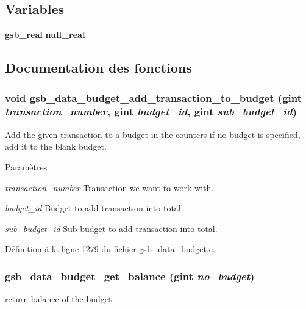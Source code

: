 \subsection*{Variables}
\begin{DoxyCompactItemize}
\item 
{\bf gsb\_\-real} {\bf null\_\-real}
\end{DoxyCompactItemize}


\subsection{Documentation des fonctions}
\subsubsection[{gsb\_\-data\_\-budget\_\-add\_\-transaction\_\-to\_\-budget}]{\setlength{\rightskip}{0pt plus 5cm}void gsb\_\-data\_\-budget\_\-add\_\-transaction\_\-to\_\-budget (gint {\em transaction\_\-number}, \/  gint {\em budget\_\-id}, \/  gint {\em sub\_\-budget\_\-id})}\label{gsb__data__budget_8c_ac21b7a13604eb934237a2ef2ad426c50}
Add the given transaction to a budget in the counters if no budget is specified, add it to the blank budget.


\begin{DoxyParams}{Paramètres}
\item[{\em transaction\_\-number}]Transaction we want to work with. \item[{\em budget\_\-id}]Budget to add transaction into total. \item[{\em sub\_\-budget\_\-id}]Sub-\/budget to add transaction into total. \end{DoxyParams}


Définition à la ligne 1279 du fichier gsb\_\-data\_\-budget.c.

\subsubsection[{gsb\_\-data\_\-budget\_\-get\_\-balance}]{ gsb\_\-data\_\-budget\_\-get\_\-balance (gint {\em no\_\-budget})}\label{gsb__data__budget_8c_a74f736d36e08cf069bd829f082c40c7b}
return balance of the budget


